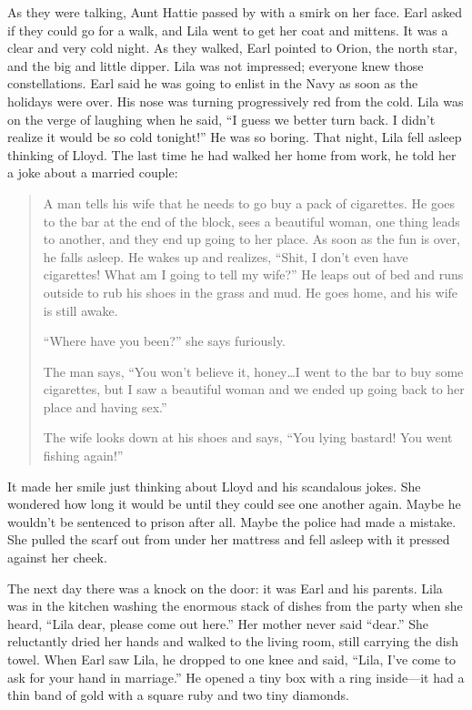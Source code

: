 \documentclass[
  american,
  letterpaper,
]{book}
\begin{document}
As they were talking, Aunt Hattie passed by with a smirk on her face.
Earl asked if they could go for a walk, and Lila went to get her coat
and mittens. It was a clear and very cold night. As they walked, Earl
pointed to Orion, the north star, and the big and little dipper. Lila
was not impressed; everyone knew those constellations. Earl said he was
going to enlist in the Navy as soon as the holidays were over. His nose
was turning progressively red from the cold. Lila was on the verge of
laughing when he said, ``I guess we better turn back. I didn't realize
it would be so cold tonight!'' He was so boring. That night, Lila fell
asleep thinking of Lloyd. The last time he had walked her home from
work, he told her a joke about a married couple:

\begin{quote}
A man tells his wife that he needs to go buy a pack of cigarettes. He
goes to the bar at the end of the block, sees a beautiful woman, one
thing leads to another, and they end up going to her place. As soon as
the fun is over, he falls asleep. He wakes up and realizes, ``Shit, I
don't even have cigarettes! What am I going to tell my wife?'' He leaps
out of bed and runs outside to rub his shoes in the grass and mud. He
goes home, and his wife is still awake.

``Where have you been?'' she says furiously.

The man says, ``You won't believe it, honey\ldots I went to the bar to
buy some cigarettes, but I saw a beautiful woman and we ended up going
back to her place and having sex.''

The wife looks down at his shoes and says, ``You lying bastard! You went
fishing again!''
\end{quote}

It made her smile just thinking about Lloyd and his scandalous jokes.
She wondered how long it would be until they could see one another
again. Maybe he wouldn't be sentenced to prison after all. Maybe the
police had made a mistake. She pulled the scarf out from under her
mattress and fell asleep with it pressed against her cheek.

The next day there was a knock on the door: it was Earl and his parents.
Lila was in the kitchen washing the enormous stack of dishes from the
party when she heard, ``Lila dear, please come out here.'' Her mother
never said ``dear.'' She reluctantly dried her hands and walked to the
living room, still carrying the dish towel. When Earl saw Lila, he
dropped to one knee and said, ``Lila, I've come to ask for your hand in
marriage.'' He opened a tiny box with a ring inside---it had a thin band
of gold with a square ruby and two tiny diamonds.
\end{document}
